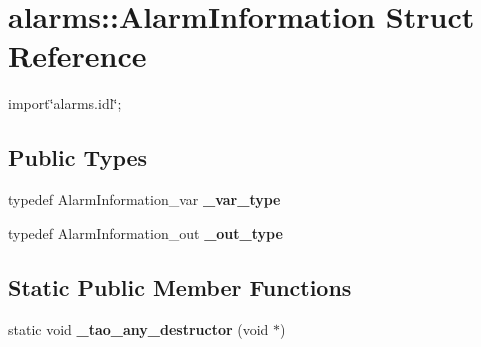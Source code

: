 \section{alarms\+:\+:Alarm\+Information Struct Reference}
\label{structalarms_1_1AlarmInformation}


{\ttfamily import\char`\"{}alarms.\+idl\char`\"{};}

\subsection*{Public Types}
\begin{DoxyCompactItemize}
\item 
typedef Alarm\+Information\+\_\+var {\bfseries \+\_\+var\+\_\+type}\label{structalarms_1_1AlarmInformation_ab5966a60e923f8ddad14180994c39122}

\item 
typedef Alarm\+Information\+\_\+out {\bfseries \+\_\+out\+\_\+type}\label{structalarms_1_1AlarmInformation_a2608e04572ee001bdb9b2bbbed9f0e58}

\end{DoxyCompactItemize}
\subsection*{Static Public Member Functions}
\begin{DoxyCompactItemize}
\item 
static void {\bfseries \+\_\+tao\+\_\+any\+\_\+destructor} (void $\ast$)\label{structalarms_1_1AlarmInformation_ad025233882ebc9d1e1bb7574f7871f62}

\end{DoxyCompactItemize}
